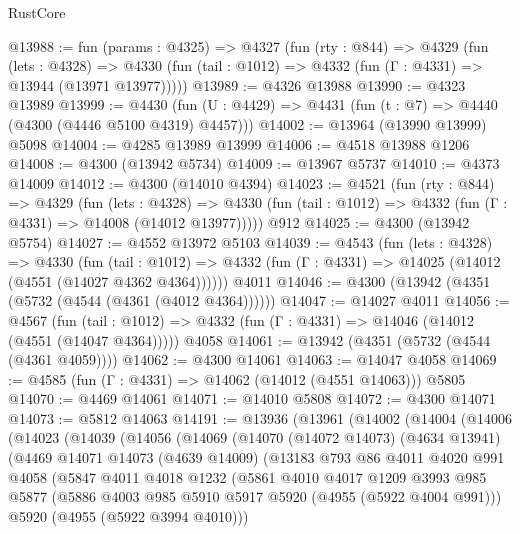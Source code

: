 \begin{lexlean}{RustCore}
\begin{coremodule}
@13988 := fun (params : @4325) =>
  @4327
    (fun (rty : @844) =>
    @4329
      (fun (lets : @4328) =>
      @4330 (fun (tail : @1012) => @4332 (fun (Γ : @4331) => @13944 (@13971 @13977)))))
@13989 := @4326 @13988
@13990 := @4323 @13989
@13999 := @4430 (fun (U : @4429) => @4431 (fun (t : @7) => @4440 (@4300 (@4446 @5100 @4319) @4457)))
@14002 := @13964 (@13990 @13999) @5098
@14004 := @4285 @13989 @13999
@14006 := @4518 @13988 @1206
@14008 := @4300 (@13942 @5734)
@14009 := @13967 @5737
@14010 := @4373 @14009
@14012 := @4300 (@14010 @4394)
@14023 := @4521
    (fun (rty : @844) =>
    @4329
      (fun (lets : @4328) =>
      @4330 (fun (tail : @1012) => @4332 (fun (Γ : @4331) => @14008 (@14012 @13977)))))
    @912
@14025 := @4300 (@13942 @5754)
@14027 := @4552 @13972 @5103
@14039 := @4543
    (fun (lets : @4328) =>
    @4330
      (fun (tail : @1012) =>
      @4332 (fun (Γ : @4331) => @14025 (@14012 (@4551 (@14027 @4362 @4364))))))
    @4011
@14046 := @4300 (@13942 (@4351 (@5732 (@4544 (@4361 (@4012 @4364))))))
@14047 := @14027 @4011
@14056 := @4567
    (fun (tail : @1012) => @4332 (fun (Γ : @4331) => @14046 (@14012 (@4551 (@14047 @4364)))))
    @4058
@14061 := @13942 (@4351 (@5732 (@4544 (@4361 @4059))))
@14062 := @4300 @14061
@14063 := @14047 @4058
@14069 := @4585 (fun (Γ : @4331) => @14062 (@14012 (@4551 @14063))) @5805
@14070 := @4469 @14061
@14071 := @14010 @5808
@14072 := @4300 @14071
@14073 := @5812 @14063
@14191 := @13936
    (@13961
      (@14002
        (@14004
          (@14006
            (@14023
              (@14039
                (@14056
                  (@14069
                    (@14070
                      (@14072 @14073)
                      (@4634 @13941)
                      (@4469
                        @14071
                        @14073
                        (@4639 @14009)
                        (@13183
                          @793
                          @86
                          @4011
                          @4020
                          @991
                          @4058
                          (@5847
                            @4011
                            @4018
                            @1232
                            (@5861
                              @4010
                              @4017
                              @1209
                              @3993
                              @985
                              @5877
                              (@5886 @4003 @985 @5910 @5917 @5920 (@4955 (@5922 @4004 @991)))
                              @5920
                              (@4955 (@5922 @3994 @4010)))

\end{coremodule}
\end{lexlean}
